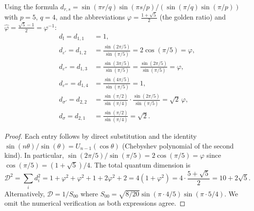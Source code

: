 \begin{proposition}\label{prop:quantum-dim-5-4}
Using the formula $d_{r,s} = \sin(\pi r/q)\sin(\pi s/p)/(\sin(\pi/q)\sin(\pi/p))$
with $p=5$, $q=4$, and the abbreviations $\varphi = \frac{1+\sqrt{5}}{2}$ (the
golden ratio) and $\hat\varphi = \frac{\sqrt{5}-1}{2} = \varphi^{-1}$:
\begin{align}
d_{\mathbb{I}} = d_{1,1} &= 1, \\
d_{\varepsilon'} = d_{1,2} &= \frac{\sin(2\pi/5)}{\sin(\pi/5)} = 2\cos(\pi/5) = \varphi, \label{eq:d12-golden}\\
d_{\varepsilon''} = d_{1,3} &= \frac{\sin(3\pi/5)}{\sin(\pi/5)} = \frac{\sin(2\pi/5)}{\sin(\pi/5)} = \varphi, \\
d_{\varepsilon'''} = d_{1,4} &= \frac{\sin(4\pi/5)}{\sin(\pi/5)} = 1, \\
d_{\sigma'} = d_{2,2} &= \frac{\sin(\pi/2)}{\sin(\pi/4)}\cdot\frac{\sin(2\pi/5)}{\sin(\pi/5)} = \sqrt{2}\,\varphi, \\
d_{\sigma} = d_{2,1} &= \frac{\sin(\pi/2)}{\sin(\pi/4)} = \sqrt{2}.
\end{align}
\end{proposition}

\begin{proof}
Each entry follows by direct substitution and the identity
$\sin(n\theta)/\sin(\theta) = U_{n-1}(\cos\theta)$ (Chebyshev polynomial of the
second kind).  In particular, $\sin(2\pi/5)/\sin(\pi/5) = 2\cos(\pi/5) = \varphi$
since $\cos(\pi/5) = (1+\sqrt{5})/4$.  The total quantum dimension is
\begin{equation}
\mathcal{D}^2 = \sum_i d_i^2 = 1 + \varphi^2 + \varphi^2 + 1 + 2\varphi^2 + 2
= 4(1 + \varphi^2) = 4\cdot\frac{5+\sqrt{5}}{2} = 10 + 2\sqrt{5}.
\end{equation}
Alternatively, $\mathcal{D} = 1/S_{00}$ where
$S_{00} = \sqrt{8/20}\sin(\pi\cdot 4/5)\sin(\pi\cdot 5/4)$.  We omit the numerical
verification as both expressions agree.
\end{proof}

